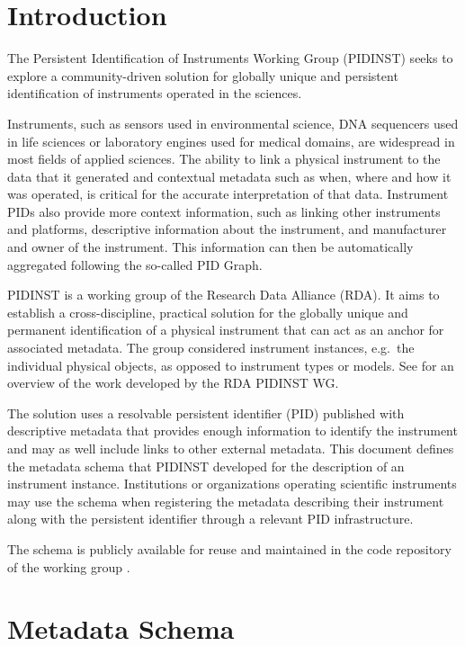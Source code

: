\documentclass[titlepage=true,twoside=false,DIV=13]{scrartcl}
\begin{document}
\section{Introduction}
\label{intro}

The Persistent Identification of Instruments Working Group (PIDINST)
seeks to explore a commu\-nity-driven solution for globally unique and
persistent identification of instruments operated in the sciences.

Instruments, such as sensors used in environmental science, DNA
sequencers used in life sciences or laboratory engines used for
medical domains, are widespread in most fields of applied sciences.
The ability to link a physical instrument to the data that it
generated and contextual metadata such as when, where and how it was
operated, is critical for the accurate interpretation of that data.
Instrument PIDs also provide more context information, such as linking
other instruments and platforms, descriptive information about the
instrument, and manufacturer and owner of the instrument.  This
information can then be automatically aggregated following the
so-called PID Graph.

PIDINST is a working group of the Research Data Alliance (RDA).  It
aims to establish a cross-discipline, practical solution for the
globally unique and permanent identification of a physical instrument
that can act as an anchor for associated metadata.  The group
considered instrument instances, e.g.\ the individual physical
objects, as opposed to instrument types or models.  See
\cite{pidinst2020} for an overview of the work developed by the RDA
PIDINST WG.

The solution uses a resolvable persistent identifier (PID) published
with descriptive metadata that provides enough information to identify
the instrument and may as well include links to other external
metadata.  This document defines the metadata schema that PIDINST
developed for the description of an instrument instance.  Institutions
or organizations operating scientific instruments may use the schema
when registering the metadata describing their instrument along with
the persistent identifier through a relevant PID infrastructure.

The schema is publicly available for reuse and maintained in the code
repository of the working group \cite{pidinst:github}.

\section{Metadata Schema}
\label{schema}
\end{document}
